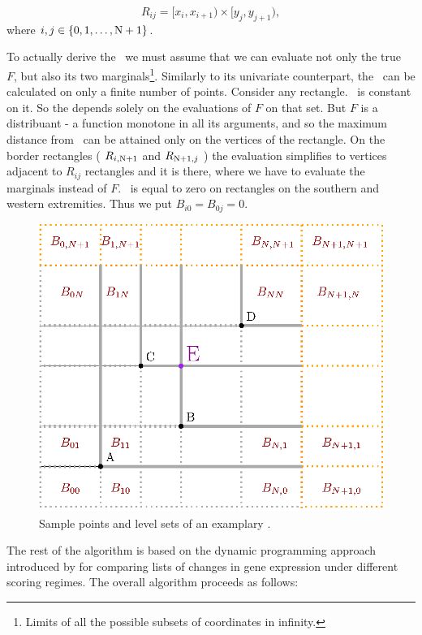 $$R_{ij} = [x_i, x_{i+1})\times[y_j, y_{j+1}),$$ 
where $i,j \in \{0, 1, \dots, \mathrm{N}+1 \}$. 

To actually derive the \KS\, we must assume that we can evaluate not only the true \cdf\, $F$, but also its two marginals\footnote{Limits of all the possible subsets of coordinates in infinity.}. Similarly to its univariate counterpart, the \KS\, can be calculated on only a finite number of points. Consider any rectangle. \Fecdf\, is constant on it. So the \KS depends solely on the evaluations of $F$ on that set. But $F$ is a distribuant - a function monotone in all its arguments, and so the maximum distance from \Fecdf\, can be attained only on the vertices of the rectangle. On the border rectangles ( $R_{i,\mathrm{N}+1}$ and $R_{\mathrm{N}+1,j}$ ) the evaluation simplifies to vertices adjacent to $R_{ij}$ rectangles and it is there, where we have to evaluate the marginals instead of $F$. \Fecdf\, is equal to zero on rectangles on the southern and western extremities. Thus we put $B_{i0} = B_{0j} = 0$. 

\begin{figure}
	\centering \includegraphics[scale=1]{./img/KS2.eps}
	\caption{Sample points and level sets of an examplary \ecdf.}\label{spaceDivision}
\end{figure}


The rest of the algorithm is based on the dynamic programming approach introduced by \citet*{NiVingron} for comparing lists of changes in gene expression under different scoring regimes. The overall algorithm proceeds as follows:

